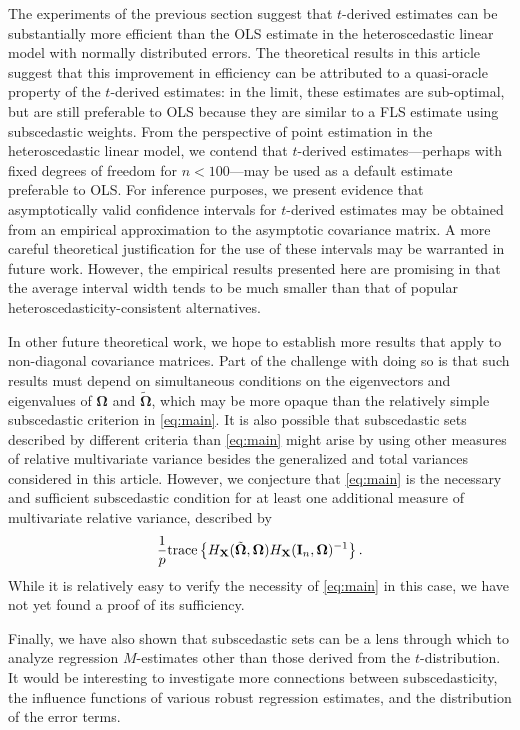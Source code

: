 \documentclass[12pt]{article}
\newcommand{\tr}{\text{\rm trace}}
\newcommand{\bl}[1]{{\mathbf #1}}
\newcommand{\bs}[1]{\boldsymbol #1}
\begin{document}
The experiments of the previous section suggest that $t$-derived estimates can be substantially more efficient than the OLS estimate in the heteroscedastic linear model with normally distributed errors. The theoretical results in this article suggest that this improvement in efficiency can be attributed to a quasi-oracle property of the $t$-derived estimates: in the limit, these estimates are sub-optimal, but are still preferable to OLS because they are similar to a FLS estimate using subscedastic weights. From the perspective of point estimation in the heteroscedastic linear model, we contend that $t$-derived estimates---perhaps with fixed degrees of freedom for $n < 100$---may be used as a default estimate preferable to OLS. For inference purposes, we present evidence that asymptotically valid confidence intervals for $t$-derived estimates may be obtained from an empirical approximation to the asymptotic covariance matrix. A more careful theoretical justification for the use of these intervals may be warranted in future work. However, the empirical results presented here are promising in that the average interval width tends to be much smaller than that of popular heteroscedasticity-consistent alternatives.

{In other future theoretical work, we hope to establish more results that apply to non-diagonal covariance matrices. Part of the challenge with doing so is that such results must depend on simultaneous conditions on the eigenvectors and eigenvalues of $\bs{\Omega}$ and $\tilde{\bs{\Omega}}$, which may be more opaque than the relatively simple subscedastic criterion in \eqref{eq:main}.} {It is also possible that subscedastic sets described by different criteria than \eqref{eq:main} might arise by using other measures of relative multivariate variance besides the generalized and total variances considered in this article. However, we conjecture that \eqref{eq:main} is the necessary and sufficient subscedastic condition for at least one additional measure of multivariate relative variance, described by
\begin{equation}\label{eq:rtrace}
    \frac{1}{p}\tr \left\{ H_{\bl{X}}(\tilde{\bs{\Omega}}, \bs{\Omega})H_{\bl{X}}(\bl{I}_n, \bs{\Omega})^{-1}\right\}.
\end{equation}
While it is relatively easy to verify the necessity of \eqref{eq:main} in this case, we have not yet found a proof of its sufficiency.}

Finally, we have also shown that subscedastic sets can be a lens through which to analyze regression $M$-estimates other than those derived from the $t$-distribution. It would be interesting to investigate more connections between subscedasticity, the influence functions of various robust regression estimates, and the distribution of the error terms.
\end{document}

